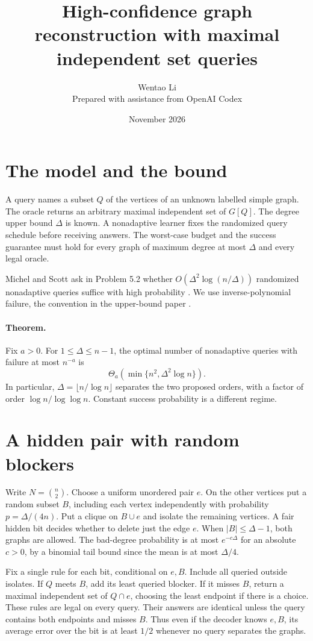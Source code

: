 \documentclass[11pt]{article}
\title{High-confidence graph reconstruction with maximal independent set queries}
\author{Wentao Li\\[2pt]\small Prepared with assistance from OpenAI Codex}
\date{November 2026}
\begin{document}
\maketitle
\section{The model and the bound}
A query names a subset $Q$ of the vertices of an unknown labelled simple graph. The oracle returns an arbitrary maximal independent set of $G[Q]$. The degree upper bound $\Delta$ is known. A nonadaptive learner fixes the randomized query schedule before receiving answers. The worst-case budget and the success guarantee must hold for every graph of maximum degree at most $\Delta$ and every legal oracle.

Michel and Scott ask in Problem 5.2 whether $O(\Delta^2\log(n/\Delta))$ randomized nonadaptive queries suffice with high probability \cite{ms}. We use inverse-polynomial failure, the convention in the upper-bound paper \cite[footnote 1]{kost}.

\paragraph{Theorem.} Fix $a>0$. For $1\le\Delta\le n-1$, the optimal number of nonadaptive queries with failure at most $n^{-a}$ is
\[
 \Theta_a\!\left(\min\{n^2,\Delta^2\log n\}\right).
\]
In particular, $\Delta=\lfloor n/\log n\rfloor$ separates the two proposed orders, with a factor of order $\log n/\log\log n$. Constant success probability is a different regime.

\section{A hidden pair with random blockers}
Write $N=\binom n2$. Choose a uniform unordered pair $e$. On the other vertices put a random subset $B$, including each vertex independently with probability $p=\Delta/(4n)$. Put a clique on $B\cup e$ and isolate the remaining vertices. A fair hidden bit decides whether to delete just the edge $e$. When $|B|\le\Delta-1$, both graphs are allowed. The bad-degree probability is at most $e^{-c\Delta}$ for an absolute $c>0$, by a binomial tail bound since the mean is at most $\Delta/4$.

Fix a single rule for each bit, conditional on $e,B$. Include all queried outside isolates. If $Q$ meets $B$, add its least queried blocker. If it misses $B$, return a maximal independent set of $Q\cap e$, choosing the least endpoint if there is a choice. These rules are legal on every query. Their answers are identical unless the query contains both endpoints and misses $B$. Thus even if the decoder knows $e,B$, its average error over the bit is at least $1/2$ whenever no query separates the graphs.
\end{document}
